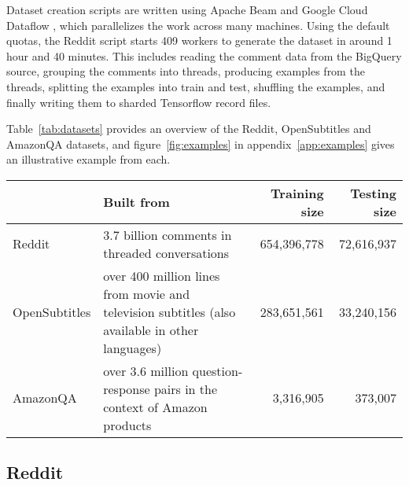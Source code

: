 \documentclass[11pt,a4paper,table]{article}
\begin{document}
Dataset creation scripts are written using Apache Beam and Google Cloud Dataflow \cite{Akidau2015}, which parallelizes the work across many machines. Using the default quotas, the Reddit script starts 409 workers to generate the dataset in around 1 hour and 40 minutes. This includes reading the comment data from the BigQuery source, grouping the comments into threads, producing examples from the threads, splitting the examples into train and test, shuffling the examples, and finally writing them to sharded Tensorflow record files.

Table~\ref{tab:datasets} provides an overview of the Reddit, OpenSubtitles and AmazonQA datasets, and figure~\ref{fig:examples} in appendix~\ref{app:examples} gives an illustrative example from each.



\begin{table*}[hbt]
    \centering
    {
        \small
        \begin{tabularx}{0.85 \textwidth}{p{18mm} p{58mm} r r}
            \toprule
             & \textbf{Built from} & \textbf{Training size} & \textbf{Testing size} \\
             \midrule
             {Reddit} &  3.7 billion comments in threaded conversations & 654,396,778 & 72,616,937 \\
             {OpenSubtitles} & over 400 million lines from movie and television subtitles (also available in other languages) &  283,651,561 & 33,240,156 \\
             {AmazonQA} &  over 3.6 million question-response pairs in the context of Amazon products  & 3,316,905 & 373,007 \\
             \bottomrule
        \end{tabularx}
    }
\caption{
        Summary of the datasets included in the public repository. The Reddit data is taken from January 2015 to December 2018, and the OpenSubtitles data from 2018.
    }
    \label{tab:datasets}
\end{table*}



\subsection{Reddit}
\end{document}
